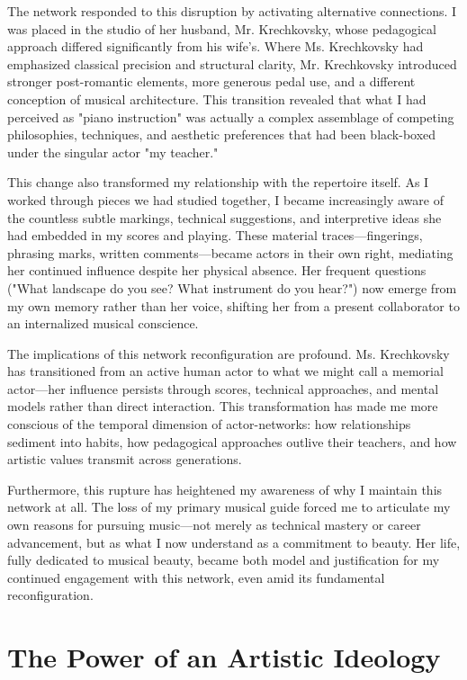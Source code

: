 \documentclass{article} %
\begin{document}
The network responded to this disruption by activating alternative connections. I was placed in the studio of her husband, Mr. Krechkovsky, whose pedagogical approach differed significantly from his wife's. Where Ms. Krechkovsky had emphasized classical precision and structural clarity, Mr. Krechkovsky introduced stronger post-romantic elements, more generous pedal use, and a different conception of musical architecture. This transition revealed that what I had perceived as "piano instruction" was actually a complex assemblage of competing philosophies, techniques, and aesthetic preferences that had been black-boxed under the singular actor "my teacher."

This change also transformed my relationship with the repertoire itself. As I worked through pieces we had studied together, I became increasingly aware of the countless subtle markings, technical suggestions, and interpretive ideas she had embedded in my scores and playing. These material traces—fingerings, phrasing marks, written comments—became actors in their own right, mediating her continued influence despite her physical absence. Her frequent questions ("What landscape do you see? What instrument do you hear?") now emerge from my own memory rather than her voice, shifting her from a present collaborator to an internalized musical conscience.

The implications of this network reconfiguration are profound. Ms. Krechkovsky has transitioned from an active human actor to what we might call a memorial actor—her influence persists through scores, technical approaches, and mental models rather than direct interaction. This transformation has made me more conscious of the temporal dimension of actor-networks: how relationships sediment into habits, how pedagogical approaches outlive their teachers, and how artistic values transmit across generations.

Furthermore, this rupture has heightened my awareness of why I maintain this network at all. The loss of my primary musical guide forced me to articulate my own reasons for pursuing music—not merely as technical mastery or career advancement, but as what I now understand as a commitment to beauty. Her life, fully dedicated to musical beauty, became both model and justification for my continued engagement with this network, even amid its fundamental reconfiguration.

\section{The Power of an Artistic Ideology}
\end{document}
